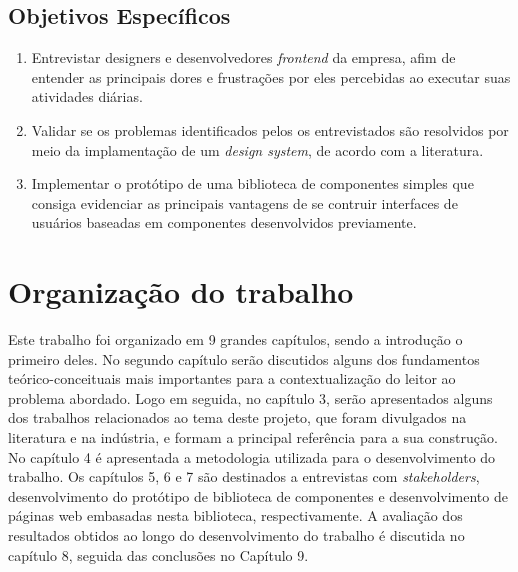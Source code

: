 \subsection{Objetivos Específicos}

\begin{enumerate}
    \item Entrevistar designers e desenvolvedores \textit{frontend} da empresa, afim de entender as principais dores e frustrações por eles percebidas ao executar suas atividades diárias.
    \item Validar se os problemas identificados pelos os entrevistados são resolvidos por meio da implamentação de um \textit{design system}, de acordo com a literatura.
    \item Implementar o protótipo de uma biblioteca de componentes simples que consiga evidenciar as principais vantagens de se contruir interfaces de usuários baseadas em componentes desenvolvidos previamente.
\end{enumerate}{}

\section{Organização do trabalho}
\label{sec:organizacaoTrabalho}

Este trabalho foi organizado em 9 grandes capítulos, sendo a introdução o primeiro deles. No segundo capítulo serão discutidos alguns dos fundamentos teórico-conceituais mais importantes para a contextualização do leitor ao problema abordado. Logo em seguida, no capítulo 3, serão apresentados alguns dos trabalhos relacionados ao tema deste projeto, que foram divulgados na literatura e na indústria, e formam a principal referência para a sua construção. No capítulo 4 é apresentada a metodologia utilizada para o desenvolvimento do trabalho. Os capítulos 5, 6 e 7 são destinados a entrevistas com \textit{stakeholders}, desenvolvimento do protótipo de biblioteca de componentes e desenvolvimento de páginas web embasadas nesta biblioteca, respectivamente. A avaliação dos resultados obtidos ao longo do desenvolvimento do trabalho é discutida no capítulo 8, seguida das conclusões no Capítulo 9.

